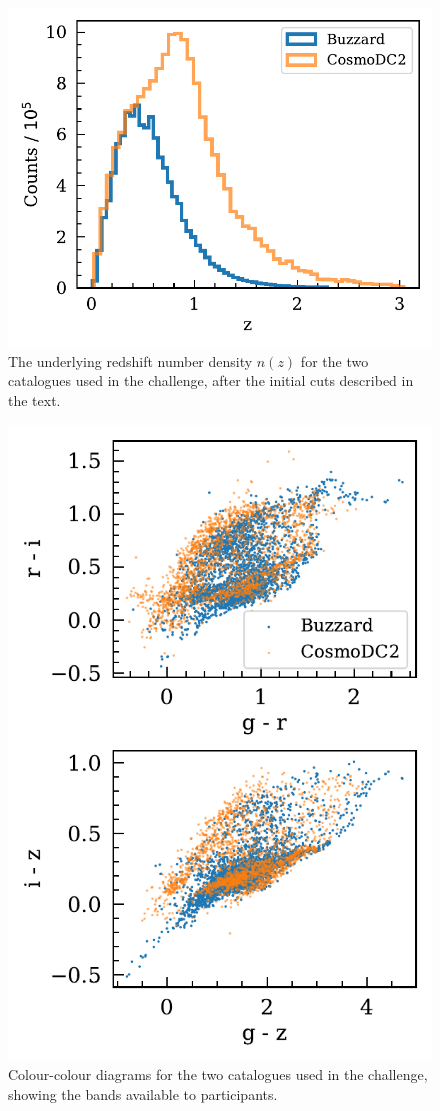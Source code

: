 \documentclass[twocolumn,twocolappendix]{aastex63}
\begin{document}
\begin{figure}[htbp]
	\includegraphics[width=0.9\linewidth]{results/initial_data.pdf}
	\caption{The underlying redshift number density $n(z)$ for the two catalogues used in the challenge,
		after the initial cuts described in the text.}
	\label{fig:initial_nz}
\end{figure}

\begin{figure}[htbp]
	\includegraphics[width=0.9\linewidth]{results/colour_colour.pdf}
	\caption{Colour-colour diagrams for the two catalogues used in the challenge, showing the bands
		available to participants.}
	\label{fig:colour_colour}
\end{figure}
\end{document}
